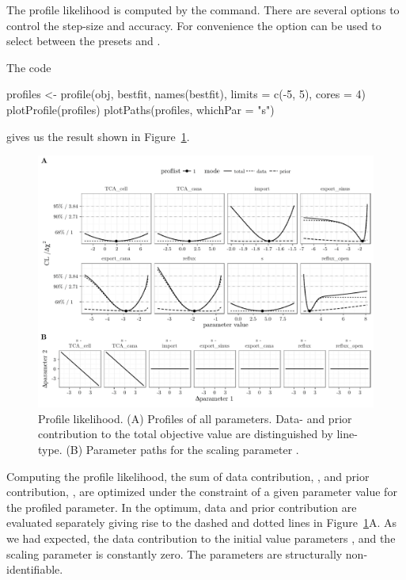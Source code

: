 \documentclass[article]{jss}
\begin{document}
The profile likelihood is computed by the  command. There are several options to control the step-size and accuracy. For convenience the  option can be used to select between the presets  and .

The code
\begin{CodeChunk}
\begin{CodeInput}
profiles <- profile(obj, bestfit, names(bestfit), limits = c(-5, 5), cores = 4)
plotProfile(profiles)
plotPaths(profiles, whichPar = "s")
\end{CodeInput}
\end{CodeChunk}
gives us the result shown in Figure~\ref{fig:pl}.
\begin{figure}[ht]
	\centering
	\includegraphics[width = \textwidth]{images/figure7}
	\caption{Profile likelihood. (A) Profiles of all parameters. Data- and prior contribution to the total objective value are distinguished by line-type. (B) Parameter paths for the scaling parameter .}
	\label{fig:pl}
\end{figure}
Computing the profile likelihood, the sum of data contribution, , and prior contribution, , are optimized under the constraint of a given parameter value for the profiled parameter. In the optimum, data and prior contribution are evaluated separately giving rise to the dashed and dotted lines in Figure~\ref{fig:pl}A. As we had expected, the data contribution to the initial value parameters ,  and the scaling parameter  is constantly zero. The parameters are structurally non-identifiable.
\end{document}
